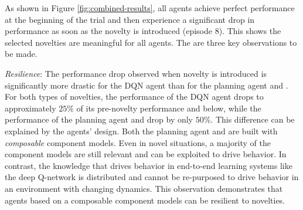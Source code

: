 \documentclass{article}
\begin{document}
As shown in Figure \ref{fig:combined-results}, all agents achieve perfect performance at the beginning of the trial and then experience a significant drop in performance as soon as the novelty is introduced (episode $8$). This shows the selected novelties are meaningful for all agents. The are three key observations to be made.

\emph{Resilience}: The performance drop observed when novelty is introduced is significantly more drastic for the DQN agent than for the planning agent and \hydra. For both types of novelties, the performance of the DQN agent drops to approximately $25\%$ of its pre-novelty performance and below, while the performance of the planning agent and \hydra drop by only $50\%$. 
This difference can be explained by the agents' design. 
Both the planning agent and \hydra are built with \emph{composable} component models. 
Even in novel situations, a majority of the component models are still relevant and can be exploited to drive behavior. 
In contrast, the knowledge that drives behavior in end-to-end learning systems like the deep Q-network is distributed and cannot be re-purposed to drive behavior in an environment with changing dynamics. 
This observation demonstrates that agents based on a composable component models can be resilient to novelties.
\end{document}
